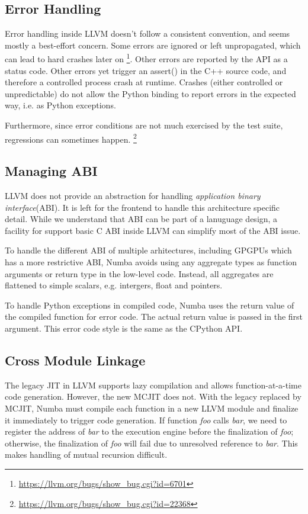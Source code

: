 \documentclass{acm_proc_article-sp}
\begin{document}
\subsection{Error Handling}

Error handling inside LLVM doesn't follow a consistent convention,
and seems mostly a best-effort concern.  Some errors are ignored or
left unpropagated, which can lead to hard crashes later on
\footnote{\url{https://llvm.org/bugs/show_bug.cgi?id=6701}}.
Other errors are reported by the API as a status
code.  Other errors yet trigger an assert() in the C++ source code, and
therefore a controlled process crash at runtime.  Crashes (either
controlled or unpredictable) do not allow the Python binding to report
errors in the expected way, i.e. as Python exceptions.

Furthermore, since error conditions are not much exercised by the test
suite, regressions can sometimes happen.
\footnote{\url{https://llvm.org/bugs/show_bug.cgi?id=22368}}

\subsection{Managing ABI}

LLVM does not provide an abstraction for handling \textit{application binary
interface}(ABI). It is left for the frontend to handle this architecture
specific detail.  While we understand that ABI can be part of a lanuguage
design, a facility for support basic C ABI inside LLVM can simplify most of the
ABI issue.

To handle the different ABI of multiple arhitectures, including GPGPUs which
has a more restrictive ABI, Numba avoids using any aggregate types as function
arguments or return type in the low-level code.  Instead, all aggregates are
flattened to simple scalars, e.g. intergers, float and pointers.

To handle Python exceptions in compiled code, Numba uses the return value of
the compiled function for error code. The actual return value is passed
in the first argument. This error code style is the same as the CPython API.

\subsection{Cross Module Linkage}

The legacy JIT in LLVM supports lazy compilation and allows function-at-a-time
code generation.  However, the new MCJIT does not. With the legacy replaced
by MCJIT, Numba must compile each function in a new LLVM module and finalize it
immediately to trigger code generation. If function \textit{foo} calls
\textit{bar}, we need to register the address of \textit{bar} to the execution
engine before the finalization of \textit{foo}; otherwise, the finalization of
\textit{foo} will fail due to unresolved reference to \textit{bar}.
This makes handling of mutual recursion difficult.
\end{document}
